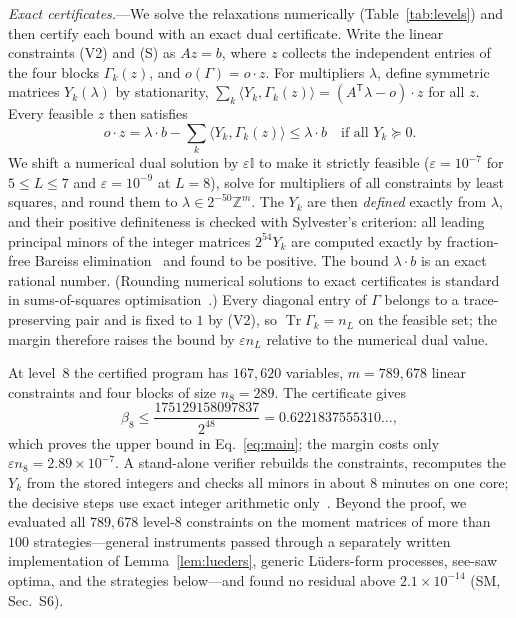 \documentclass[aps,prl,twocolumn,superscriptaddress,longbibliography,nofootinbib]{revtex4-2}
\newcommand{\Tr}{\operatorname{Tr}}
\newcommand{\one}{\mathbb{I}}
\newcommand{\tp}{\mathsf{T}}
\newcommand{\ZZ}{\mathbb{Z}}
\begin{document}
\emph{Exact certificates.}---We solve the relaxations numerically (Table~\ref{tab:levels}) and then certify each bound with an exact dual certificate. Write the linear constraints (V2) and (S) as $Az=b$, where $z$ collects the independent entries of the four blocks $\Gamma_k(z)$, and $o(\Gamma)=o\cdot z$. For multipliers $\lambda$, define symmetric matrices $Y_k(\lambda)$ by stationarity, $\sum_k\langle Y_k,\Gamma_k(z)\rangle=(A^\tp\lambda-o)\cdot z$ for all $z$. Every feasible $z$ then satisfies
\begin{equation}
o\cdot z=\lambda\cdot b-\sum_k\langle Y_k,\Gamma_k(z)\rangle\le\lambda\cdot b\quad\text{if all }Y_k\succeq0 .
\label{eq:weakdual}
\end{equation}
We shift a numerical dual solution by $\varepsilon\one$ to make it strictly feasible ($\varepsilon=10^{-7}$ for $5\le L\le7$ and $\varepsilon=10^{-9}$ at $L=8$), solve for multipliers of all constraints by least squares, and round them to $\lambda\in2^{-50}\ZZ^m$. The $Y_k$ are then \emph{defined} exactly from $\lambda$, and their positive definiteness is checked with Sylvester's criterion: all leading principal minors of the integer matrices $2^{54}Y_k$ are computed exactly by fraction-free Bareiss elimination~\cite{Bareiss1968} and found to be positive. The bound $\lambda\cdot b$ is an exact rational number. (Rounding numerical solutions to exact certificates is standard in sums-of-squares optimisation~\cite{PeyrlParrilo2008}.) Every diagonal entry of $\Gamma$ belongs to a trace-preserving pair and is fixed to $1$ by (V2), so $\Tr\Gamma_k=n_L$ on the feasible set; the margin therefore raises the bound by $\varepsilon n_L$ relative to the numerical dual value.

At level~8 the certified program has $167{,}620$ variables, $m=789{,}678$ linear constraints and four blocks of size $n_8=289$. The certificate gives
\begin{equation}
\beta_8\le\frac{175129158097837}{2^{48}}=0.6221837555310\ldots ,
\end{equation}
which proves the upper bound in Eq.~\eqref{eq:main}; the margin costs only $\varepsilon n_8=2.89\times10^{-7}$. A stand-alone verifier rebuilds the constraints, recomputes the $Y_k$ from the stored integers and checks all minors in about $8$ minutes on one core; the decisive steps use exact integer arithmetic only~\cite{repo}. Beyond the proof, we evaluated all $789{,}678$ level-8 constraints on the moment matrices of more than $100$ strategies---general instruments passed through a separately written implementation of Lemma~\ref{lem:lueders}, generic L\"uders-form processes, see-saw optima, and the strategies below---and found no residual above $2.1\times10^{-14}$ (SM, Sec.~S6).
\end{document}
